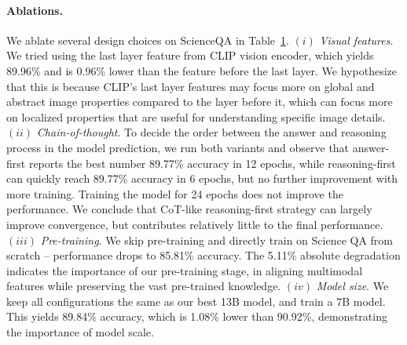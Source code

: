 \begin{figure}
  \begin{minipage}{0.5\textwidth}
\centering  
\vspace{-4mm}
\vspace{2mm}
\label{tab:scienceqa_ablation}  
  \end{minipage}
\end{figure}



\paragraph{Ablations.} We ablate several design choices on ScienceQA in Table~\ref{tab:scienceqa_ablation}.
$(i)$ {\it Visual features}. We tried using the last layer feature from CLIP vision encoder, which yields 89.96\% and is 0.96\% lower than the feature before the last layer. We hypothesize that this is because CLIP's last layer features may focus more on global and abstract image properties compared to the layer before it, which can focus more on localized properties that are useful for understanding specific image details.  
$(ii)$ {\it Chain-of-thought}. To decide the order between the answer and reasoning process in the model prediction, we run both variants and observe that answer-first reports the best number 89.77\% accuracy in 12 epochs, while reasoning-first can quickly reach 89.77\% accuracy in 6 epochs, but no further improvement with more training. Training the model for 24 epochs does not improve the performance. We conclude that CoT-like reasoning-first strategy can largely improve convergence, but contributes relatively little to the final performance.
$(iii)$ {\it Pre-training}. We skip pre-training and directly train on Science QA from scratch -- performance drops to 85.81\% accuracy. The 5.11\% absolute degradation indicates the importance of our pre-training stage, in aligning multimodal features while preserving the vast pre-trained knowledge. 
$(iv)$ {\it Model size}. We keep all configurations the same as our best 13B model, and train a 7B model.  This yields 89.84\% accuracy, which is 1.08\% lower than 90.92\%, demonstrating the importance of model scale.

